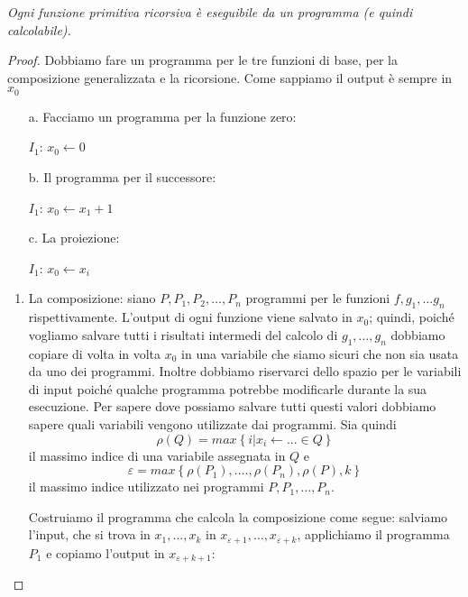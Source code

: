 \begin{teorema}
\emph{Ogni funzione primitiva ricorsiva è eseguibile da un programma
(e quindi calcolabile).}\end{teorema}
\begin{proof}
Dobbiamo fare un programma per le tre funzioni di base, per la
composizione generalizzata e la ricorsione. Come sappiamo il output è
sempre in $x_{0}$
\begin{itemize}
\item[a.] Facciamo un programma per la funzione zero:
\begin{mylisting}
$I_1$: $x_{0}\leftarrow0$
\end{mylisting}

\item[b.] Il programma per il successore:\begin{mylisting}$I_1$:
  $x_{0}\leftarrow x_{1}+1$\end{mylisting}

\item[c.] La proiezione:\begin{mylisting}$I_1$: $x_{0}\longleftarrow
  x_{i}$\end{mylisting}
\end{itemize}

\begin{enumerate}
\item La composizione: siano $P, P_1, P_2, \dots, P_n$ programmi per
  le funzioni $f,g_{1},...g_{n}$ rispettivamente. L'output di ogni
  funzione viene salvato in $x_{0}$; quindi, poich\'e vogliamo salvare
  tutti i risultati intermedi del calcolo di $g_{1},\dots,g_{n}$
  dobbiamo copiare di volta in volta $x_0$ in una variabile che siamo
  sicuri che non sia usata da uno dei programmi. Inoltre dobbiamo
  riservarci dello spazio per le variabili di input poich\'e qualche
  programma potrebbe modificarle durante la sua esecuzione.  Per
  sapere dove possiamo salvare tutti questi valori dobbiamo sapere
  quali variabili vengono utilizzate dai programmi.
  Sia quindi
  $$\rho(Q)=max\left\{ i|x_{i}\leftarrow...\in Q\right\}$$
  il massimo indice di una variabile assegnata in $Q$ e
  $$\varepsilon=max\left\{
  \rho(P_{1}),....,\rho(P_{n}),\rho(P),k\right\}$$
  il massimo indice utilizzato nei programmi $P, P_1, \dots, P_n$.

Costruiamo il programma che calcola la composizione come segue:
salviamo l'input, che si trova in $x_{1},\dots,x_{k}$ in
$x_{\varepsilon+1},\dots,x_{\varepsilon+k}$, applichiamo il programma
$P_1$ e copiamo l'output in $x_{\varepsilon+k+1}$:


\end{enumerate}
\end{proof}
